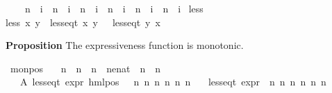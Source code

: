 \begin{isabellebody}
\ \ \ \ {\isacharparenleft}{\kern0pt}n{}\ {\isasymle}\ i{}\ {\isasymand}\ n{}\ {\isasymle}\ i{}\ {\isasymand}\ n{}\ {\isasymle}\ i{}\ {\isasymand}\ n{}\ {\isasymle}\ i{}\ {\isasymand}\ n{}\ {\isasymle}\ i{}\ {\isasymand}\ n{}\ {\isasymle}\ i{}{\isacharparenright}{\kern0pt}{\isachardoublequoteclose}\isanewline
\isanewline
{}\isamarkupfalse%
\ less\ \isanewline
{\isachardoublequoteopen}less\ x\ y\ {\isasymequiv}\ less{\isacharunderscore}{\kern0pt}eq{\isacharunderscore}{\kern0pt}t\ x\ y\ {\isasymand}\ {\isasymnot}\ {\isacharparenleft}{\kern0pt}less{\isacharunderscore}{\kern0pt}eq{\isacharunderscore}{\kern0pt}t\ y\ x{\isacharparenright}{\kern0pt}{\isachardoublequoteclose}\isanewline
%
\begin{isamarkuptext}%
\textbf{Proposition} The expressiveness function is monotonic.%
\end{isamarkuptext}\isamarkuptrue%
\isamarkupfalse%
\ mon{\isacharunderscore}{\kern0pt}pos{\isacharcolon}{\kern0pt}\isanewline
\ \ \ n{}\ \ n{}\ \ n{}\ \ n{}{\isacharcolon}{\kern0pt}{\isacharcolon}{\kern0pt}enat\ \ n{}\ \ n{}\ \ {\isasymalpha}\isanewline
\ \ \ A{}{\isacharcolon}{\kern0pt}\ {\isachardoublequoteopen}less{\isacharunderscore}{\kern0pt}eq{\isacharunderscore}{\kern0pt}t\ {\isacharparenleft}{\kern0pt}expr\ {\isacharparenleft}{\kern0pt}hml{\isacharunderscore}{\kern0pt}pos\ {\isasymalpha}\ {\isasymphi}{\isacharparenright}{\kern0pt}{\isacharparenright}{\kern0pt}\ {\isacharparenleft}{\kern0pt}n{}{\isacharcomma}{\kern0pt}\ n{}{\isacharcomma}{\kern0pt}\ n{}{\isacharcomma}{\kern0pt}\ n{}{\isacharcomma}{\kern0pt}\ n{}{\isacharcomma}{\kern0pt}\ n{}{\isacharparenright}{\kern0pt}{\isachardoublequoteclose}\isanewline
\ \ \ {\isachardoublequoteopen}less{\isacharunderscore}{\kern0pt}eq{\isacharunderscore}{\kern0pt}t\ {\isacharparenleft}{\kern0pt}expr\ {\isasymphi}{\isacharparenright}{\kern0pt}\ {\isacharparenleft}{\kern0pt}n{}{\isacharcomma}{\kern0pt}\ n{}{\isacharcomma}{\kern0pt}\ n{}{\isacharcomma}{\kern0pt}\ n{}{\isacharcomma}{\kern0pt}\ n{}{\isacharcomma}{\kern0pt}\ n{}{\isacharparenright}{\kern0pt}{\isachardoublequoteclose}\ \isanewline

\end{isabellebody}
